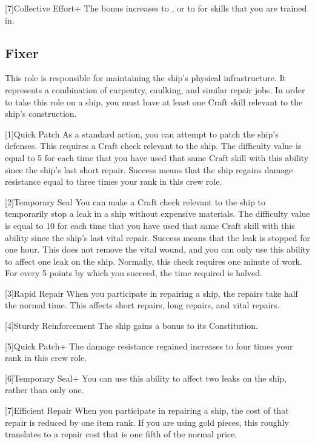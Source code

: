     [7]{Collective Effort+} The bonus increases to , or to  for skills that you are trained in.

  \subsection{Fixer}
    This role is responsible for maintaining the ship's physical infrastructure.
    It represents a combination of carpentry, caulking, and similar repair jobs.
    In order to take this role on a ship, you must have at least one Craft skill relevant to the ship's construction.

    [1]{Quick Patch} As a standard action, you can attempt to patch the ship's defenses.
      This requires a Craft check relevant to the ship.
      The difficulty value is equal to 5  for each time that you have used that same Craft skill with this ability since the ship's last short repair.
      Success means that the ship regains damage resistance equal to three times your rank in this crew role.

    [2]{Temporary Seal} You can make a Craft check relevant to the ship to temporarily stop a leak in a ship without expensive materials.
      The difficulty value is equal to 10  for each time that you have used that same Craft skill with this ability since the ship's last vital repair.
      Success means that the leak is stopped for one hour.
      This does not remove the vital wound, and you can only use this ability to affect one leak on the ship.
      Normally, this check requires one minute of work.
      For every 5 points by which you succeed, the time required is halved.

    [3]{Rapid Repair} When you participate in repairing a ship, the repairs take half the normal time.
      This affects short repairs, long repairs, and vital repairs.

    [4]{Sturdy Reinforcement} The ship gains a  bonus to its Constitution.

    [5]{Quick Patch+} The damage resistance regained increases to four times your rank in this crew role.

    [6]{Temporary Seal+} You can use this ability to affect two leaks on the ship, rather than only one.

    [7]{Efficient Repair} When you participate in repairing a ship, the cost of that repair is reduced by one item rank.
      If you are using gold pieces, this roughly translates to a repair cost that is one fifth of the normal price.

